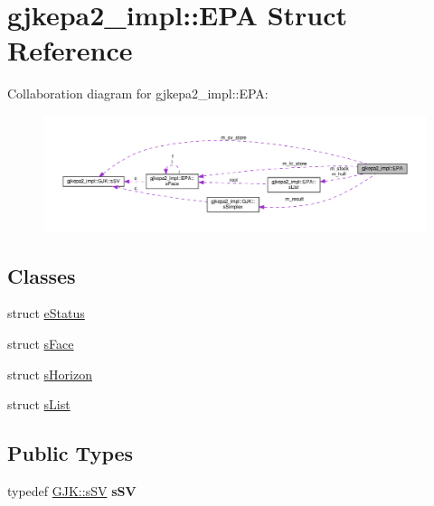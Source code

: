 \hypertarget{structgjkepa2__impl_1_1EPA}{}\section{gjkepa2\+\_\+impl\+:\+:E\+PA Struct Reference}
\label{structgjkepa2__impl_1_1EPA}


Collaboration diagram for gjkepa2\+\_\+impl\+:\+:E\+PA\+:
\nopagebreak
\begin{figure}[H]
\begin{center}
\leavevmode
\includegraphics[width=350pt]{structgjkepa2__impl_1_1EPA__coll__graph}
\end{center}
\end{figure}
\subsection*{Classes}
\begin{DoxyCompactItemize}
\item 
struct \hyperlink{structgjkepa2__impl_1_1EPA_1_1eStatus}{e\+Status}
\item 
struct \hyperlink{structgjkepa2__impl_1_1EPA_1_1sFace}{s\+Face}
\item 
struct \hyperlink{structgjkepa2__impl_1_1EPA_1_1sHorizon}{s\+Horizon}
\item 
struct \hyperlink{structgjkepa2__impl_1_1EPA_1_1sList}{s\+List}
\end{DoxyCompactItemize}
\subsection*{Public Types}
\begin{DoxyCompactItemize}
\item 
\mbox{\label{structgjkepa2__impl_1_1EPA_ae68df593da0fe83750ca5d214f3b99e1}} 
typedef \hyperlink{structgjkepa2__impl_1_1GJK_1_1sSV}{G\+J\+K\+::s\+SV} {\bfseries s\+SV}
\end{DoxyCompactItemize}
